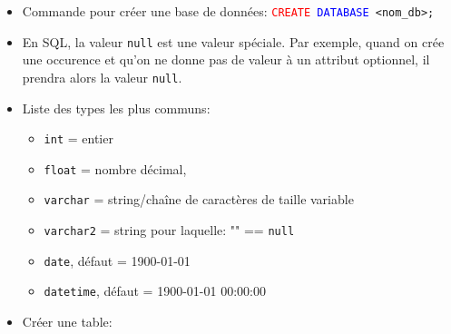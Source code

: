 \documentclass[a4paper]{article}
\begin{document}
\begin{itemize}



\item Commande pour créer une base de données: \texttt{\textcolor{red}{CREATE} \textcolor{blue}{DATABASE} <nom\_db>;}



\item En SQL, la valeur \texttt{null} est une valeur spéciale. Par exemple, quand on crée une occurence et qu'on ne donne pas de valeur à un attribut optionnel, il prendra alors la valeur \texttt{null}.



\item Liste des types les plus communs:
\begin{itemize}
    \item \texttt{int} = entier
    \item \texttt{float} = nombre décimal,
    \item \texttt{varchar} = string/chaîne de caractères de taille variable
    \item \texttt{varchar2} = string pour laquelle: "" == \texttt{null}
    \item \texttt{date}, défaut = 1900-01-01
    \item \texttt{datetime}, défaut = 1900-01-01 00:00:00
\end{itemize}



\item Créer une table:
\begin{center}
\end{center}



\end{itemize}
\end{document}
